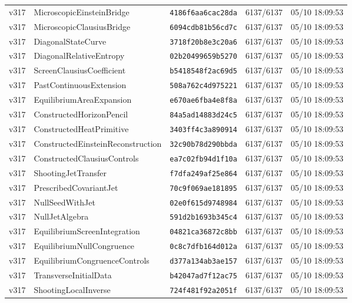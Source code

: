 \documentclass[11pt]{article}
\theoremstyle{definition}\newtheorem{deriv}{Derivação}
\begin{document}
{\begin{longtable}{@{}lllll@{}}
v317 & MicroscopicEinsteinBridge & \texttt{4186f6aa6cac28da} & 6137/6137 & 05/10 18:09:53 \\
v317 & MicroscopicClausiusBridge & \texttt{6094cdb81b56cd7c} & 6137/6137 & 05/10 18:09:53 \\
v317 & DiagonalStateCurve & \texttt{3718f20b8e3c20a6} & 6137/6137 & 05/10 18:09:53 \\
v317 & DiagonalRelativeEntropy & \texttt{02b20499659b5270} & 6137/6137 & 05/10 18:09:53 \\
v317 & ScreenClausiusCoefficient & \texttt{b5418548f2ac69d5} & 6137/6137 & 05/10 18:09:53 \\
v317 & PastContinuousExtension & \texttt{508a762c4d975221} & 6137/6137 & 05/10 18:09:53 \\
v317 & EquilibriumAreaExpansion & \texttt{e670ae6fba4e8f8a} & 6137/6137 & 05/10 18:09:53 \\
v317 & ConstructedHorizonPencil & \texttt{84a5ad14883d24c5} & 6137/6137 & 05/10 18:09:53 \\
v317 & ConstructedHeatPrimitive & \texttt{3403ff4c3a890914} & 6137/6137 & 05/10 18:09:53 \\
v317 & ConstructedEinsteinReconstruction & \texttt{32c90b78d290bbda} & 6137/6137 & 05/10 18:09:53 \\
v317 & ConstructedClausiusControls & \texttt{ea7c02fb94d1f10a} & 6137/6137 & 05/10 18:09:53 \\
v317 & ShootingJetTransfer & \texttt{f7dfa249af25e864} & 6137/6137 & 05/10 18:09:53 \\
v317 & PrescribedCovariantJet & \texttt{70c9f069ae181895} & 6137/6137 & 05/10 18:09:53 \\
v317 & NullSeedWithJet & \texttt{02e0f615d9748984} & 6137/6137 & 05/10 18:09:53 \\
v317 & NullJetAlgebra & \texttt{591d2b1693b345c4} & 6137/6137 & 05/10 18:09:53 \\
v317 & EquilibriumScreenIntegration & \texttt{04821ca36872c8bb} & 6137/6137 & 05/10 18:09:53 \\
v317 & EquilibriumNullCongruence & \texttt{0c8c7dfb164d012a} & 6137/6137 & 05/10 18:09:53 \\
v317 & EquilibriumCongruenceControls & \texttt{d377a134ab3ae157} & 6137/6137 & 05/10 18:09:53 \\
v317 & TransverseInitialData & \texttt{b42047ad7f12ac75} & 6137/6137 & 05/10 18:09:53 \\
v317 & ShootingLocalInverse & \texttt{724f481f92a2051f} & 6137/6137 & 05/10 18:09:53 \\

\end{longtable}}
\end{document}
